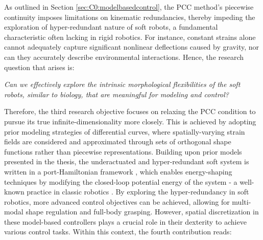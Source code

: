 
As outlined in Section \ref{sec:C0:modelbasedcontrol}, the PCC method's piecewise continuity imposes limitations on kinematic redundancies, thereby impeding the exploration of hyper-redundant nature of soft robots, a fundamental characteristic often lacking in rigid robotics. For instance, constant strains alone cannot adequately capture significant nonlinear deflections caused by gravity, nor can they accurately describe environmental interactions. Hence, the research question that arises is:
%
\begin{center}
\textit{Can we effectively explore the intrinsic morphological flexibilities of the soft robots, similar to biology, that are meaningful for modeling and control?}
\end{center}
%
Therefore, the third research objective focuses on relaxing the PCC condition to pursue its true infinite-dimensionality more closely. This is achieved by adopting prior modeling strategies of differential curves, where spatially-varying strain fields are considered and approximated through sets of orthogonal shape functions rather than piecewise representations. Building upon prior models presented in the thesis, the underactuated and hyper-redundant soft system is written in a port-Hamiltonian framework \cite{Schaft2004,Ortega2002}, which enables energy-shaping techniques by modifying the closed-loop potential energy of the system - a well-known practice in classic robotics \cite{Schaft2004,Ortega1998,Ortega2002}. By exploring the hyper-redundancy in soft robotics, more advanced control objectives can be achieved, allowing for multi-modal shape regulation and full-body grasping. However, spatial discretization in these model-based controllers plays a crucial role in their dexterity to achieve various control tasks. Within this context, the fourth contribution reads:

 \newpage


